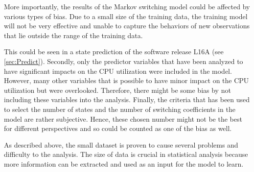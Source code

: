 More importantly, the results of the Markov switching model could
be affected by various types of bias. Due to a small size of the training
data, the training model will not be very effective and unable to
capture the behaviors of new observations that lie outside the range
of the training data. %
\begin{comment}
For this reason, a prediction for the new observations might not be
accurate as it should be. 
\end{comment}
This could be seen in a state prediction of the software release L16A
(see \ref{sec:Predict}). Secondly, only the predictor variables that
have been analyzed to have significant impacts on the CPU utilization
were included in the model. However, many other variables that is
possible to have minor impact on the CPU utilization but were overlooked.
Therefore, there might be some bias by not including these variables
into the analysis. Finally, the criteria that has been used to select
the number of states and the number of switching coefficients in the
model are rather subjective. Hence, these chosen number might not
be the best for different perspectives and so could be counted as
one of the bias as well. %
\begin{comment}
other factors which are not considered in the model might also be
the reason of causing a bias. The chosen predictor variables in this
thesis are variables that have a partial prior knowledge and have
been analyzed to have some significant impacts on CPU utilization.
However, it is possible that there are still some explanatory information
that is overlooked. Finally, selecting the number of states and switching
coefficients in the model could cause a bias as well. Finally, selecting
the number of states and the number of switching coefficients in the
model could cause a bias as well. 
\end{comment}

As described above, the small dataset is proven to cause several problems
and difficulty to the analysis. The size of data is crucial in statistical
analysis because more information can be extracted and used as an
input for the model to learn. 

